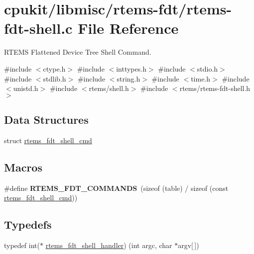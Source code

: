 \hypertarget{rtems-fdt-shell_8c}{}\section{cpukit/libmisc/rtems-\/fdt/rtems-\/fdt-\/shell.c File Reference}
\label{rtems-fdt-shell_8c}


R\+T\+E\+MS Flattened Device Tree Shell Command.  


{\ttfamily \#include $<$ctype.\+h$>$}\newline
{\ttfamily \#include $<$inttypes.\+h$>$}\newline
{\ttfamily \#include $<$stdio.\+h$>$}\newline
{\ttfamily \#include $<$stdlib.\+h$>$}\newline
{\ttfamily \#include $<$string.\+h$>$}\newline
{\ttfamily \#include $<$time.\+h$>$}\newline
{\ttfamily \#include $<$unistd.\+h$>$}\newline
{\ttfamily \#include $<$rtems/shell.\+h$>$}\newline
{\ttfamily \#include $<$rtems/rtems-\/fdt-\/shell.\+h$>$}\newline
\subsection*{Data Structures}
\begin{DoxyCompactItemize}
\item 
struct \mbox{\hyperlink{structrtems__fdt__shell__cmd}{rtems\+\_\+fdt\+\_\+shell\+\_\+cmd}}
\end{DoxyCompactItemize}
\subsection*{Macros}
\begin{DoxyCompactItemize}
\item 
\mbox{\label{rtems-fdt-shell_8c_a0c6e2b00dc5cf3093e7cb851ac141c48}} 
\#define {\bfseries R\+T\+E\+M\+S\+\_\+\+F\+D\+T\+\_\+\+C\+O\+M\+M\+A\+N\+DS}~(sizeof (table) / sizeof (const \mbox{\hyperlink{structrtems__fdt__shell__cmd}{rtems\+\_\+fdt\+\_\+shell\+\_\+cmd}}))
\end{DoxyCompactItemize}
\subsection*{Typedefs}
\begin{DoxyCompactItemize}
\item 
typedef int($\ast$ \mbox{\hyperlink{rtems-fdt-shell_8c_a0189fbb9d9f8d895a991ff4e73cea6a8}{rtems\+\_\+fdt\+\_\+shell\+\_\+handler}}) (int argc, char $\ast$argv\mbox{[}$\,$\mbox{]})
\end{DoxyCompactItemize}
